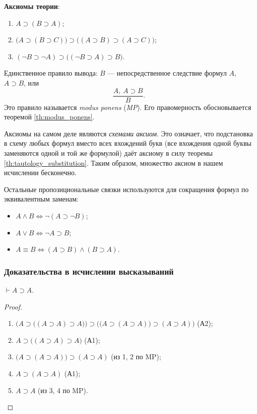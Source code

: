 \textbf{Аксиомы теории}:
\begin{enumerate}[label=(А\arabic*)]
    \item $A \supset (B \supset A)$;
    \item $\Big(A \supset (B \supset C)\Big) \supset \Big((A \supset B) \supset (A \supset C)\Big)$;
    \item $(\neg B \supset \neg A) \supset \Big((\neg B \supset A) \supset B\Big)$.
\end{enumerate}
Единственное правило вывода: $B$ --- непосредственное следствие формул $A$, $A \supset B$, или
\[
    \frac{A,\ A \supset B}{B}.
\]
Это правило называется \textit{modus ponens} (\textit{MP}). Его правомерность обосновывается теоремой \ref{th:modus_ponens}.
\begin{remark}
    Аксиомы на самом деле являются \textit{схемами аксиом}. Это означает, что подстановка в схему любых формул вместо всех вхождений букв (все вхождения одной буквы заменяются одной и той же формулой) даёт аксиому в силу теоремы \ref{th:tautology_substitution}. Таким образом, множество аксиом в нашем исчислении бесконечно.
\end{remark}
\begin{remark}
    Остальные пропозициональные связки используются для сокращения формул по эквивалентным заменам:
    \begin{itemize}
        \item $A \land B \Longleftrightarrow \neg(A \supset \neg B)$;
        \item $A \lor B \Longleftrightarrow \neg A \supset B$;
        \item $A \equiv B \Longleftrightarrow (A \supset B) \land (B \supset A)$.
    \end{itemize}
\end{remark}

\subsubsection{Доказательства в исчислении высказываний}
\begin{lemma}\label{th:a_supset_a}
    $\vdash A \supset A$.
\end{lemma}
\begin{proof}\leavevmode
    \begin{enumerate}
        \item $\Big(A \supset \big((A \supset A) \supset A\big)\Big) \supset \Big(\big(A \supset (A \supset A)\big) \supset (A \supset A)\Big)$ (А2);
        \item $A \supset \big((A \supset A) \supset A\big)$ (А1);
        \item $\big(A \supset (A \supset A)\big) \supset (A \supset A)$ (из 1, 2 по MP);
        \item $A \supset (A \supset A)$ (А1);
        \item $A \supset A$ (из 3, 4 по MP).
    \end{enumerate}
\end{proof}

